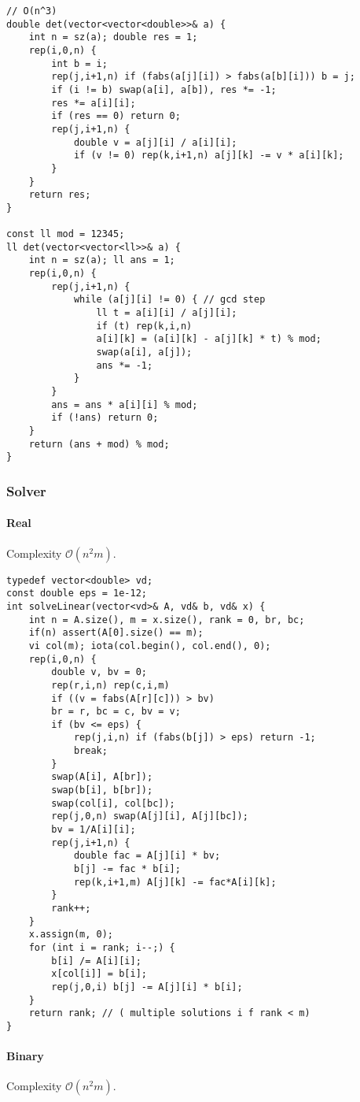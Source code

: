 \documentclass[a4paper,9pt]{article}
\begin{document}
\begin{lstlisting}
// O(n^3)
double det(vector<vector<double>>& a) {
	int n = sz(a); double res = 1;
	rep(i,0,n) {
		int b = i;
		rep(j,i+1,n) if (fabs(a[j][i]) > fabs(a[b][i])) b = j;
		if (i != b) swap(a[i], a[b]), res *= -1;
		res *= a[i][i];
		if (res == 0) return 0;
		rep(j,i+1,n) {
			double v = a[j][i] / a[i][i];
			if (v != 0) rep(k,i+1,n) a[j][k] -= v * a[i][k];
		}
	}
	return res;
}

const ll mod = 12345;
ll det(vector<vector<ll>>& a) {
	int n = sz(a); ll ans = 1;
	rep(i,0,n) {
		rep(j,i+1,n) {
			while (a[j][i] != 0) { // gcd step
				ll t = a[i][i] / a[j][i];
				if (t) rep(k,i,n)
				a[i][k] = (a[i][k] - a[j][k] * t) % mod;
				swap(a[i], a[j]);
				ans *= -1;
			}
		}
		ans = ans * a[i][i] % mod;
		if (!ans) return 0;
	}
	return (ans + mod) % mod;
}
\end{lstlisting}

\subsubsection{Solver}

\paragraph{Real} Complexity $\mathcal{O}(n^2m)$.
\begin{lstlisting}
typedef vector<double> vd;
const double eps = 1e-12;
int solveLinear(vector<vd>& A, vd& b, vd& x) {
	int n = A.size(), m = x.size(), rank = 0, br, bc;
	if(n) assert(A[0].size() == m);
	vi col(m); iota(col.begin(), col.end(), 0);
	rep(i,0,n) {
		double v, bv = 0;
		rep(r,i,n) rep(c,i,m)
		if ((v = fabs(A[r][c])) > bv)
		br = r, bc = c, bv = v;
		if (bv <= eps) {
			rep(j,i,n) if (fabs(b[j]) > eps) return -1;
			break;
		}
		swap(A[i], A[br]);
		swap(b[i], b[br]);
		swap(col[i], col[bc]);
		rep(j,0,n) swap(A[j][i], A[j][bc]);
		bv = 1/A[i][i];
		rep(j,i+1,n) {
			double fac = A[j][i] * bv;
			b[j] -= fac * b[i];
			rep(k,i+1,m) A[j][k] -= fac*A[i][k];
		}
		rank++;
	}
	x.assign(m, 0);
	for (int i = rank; i--;) {
		b[i] /= A[i][i];
		x[col[i]] = b[i];
		rep(j,0,i) b[j] -= A[j][i] * b[i];
	}
	return rank; // ( multiple solutions i f rank < m)
}
\end{lstlisting}

\paragraph{Binary} Complexity $\mathcal{O}(n^2m)$.
\end{document}
